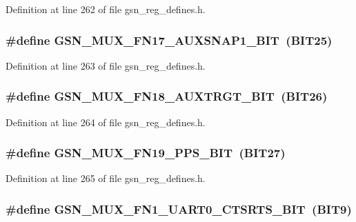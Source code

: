 Definition at line 262 of file gsn\_\-reg\_\-defines.h.

\hypertarget{a00546_af6cd23b5728c77f1cdf2127bc5075e1d}{
\subsubsection[{GSN\_\-MUX\_\-FN17\_\-AUXSNAP1\_\-BIT}]{\setlength{\rightskip}{0pt plus 5cm}\#define GSN\_\-MUX\_\-FN17\_\-AUXSNAP1\_\-BIT~(BIT25)}}
\label{a00546_af6cd23b5728c77f1cdf2127bc5075e1d}


Definition at line 263 of file gsn\_\-reg\_\-defines.h.

\hypertarget{a00546_ab9ab01862c25de4775d41150ca7ac187}{
\subsubsection[{GSN\_\-MUX\_\-FN18\_\-AUXTRGT\_\-BIT}]{\setlength{\rightskip}{0pt plus 5cm}\#define GSN\_\-MUX\_\-FN18\_\-AUXTRGT\_\-BIT~(BIT26)}}
\label{a00546_ab9ab01862c25de4775d41150ca7ac187}


Definition at line 264 of file gsn\_\-reg\_\-defines.h.

\hypertarget{a00546_a34e272cdfe3fdf3d66d84e62a5d82b6c}{
\subsubsection[{GSN\_\-MUX\_\-FN19\_\-PPS\_\-BIT}]{\setlength{\rightskip}{0pt plus 5cm}\#define GSN\_\-MUX\_\-FN19\_\-PPS\_\-BIT~(BIT27)}}
\label{a00546_a34e272cdfe3fdf3d66d84e62a5d82b6c}


Definition at line 265 of file gsn\_\-reg\_\-defines.h.

\hypertarget{a00546_a53aebca4d854c2382b9963eb743122ae}{
\subsubsection[{GSN\_\-MUX\_\-FN1\_\-UART0\_\-CTSRTS\_\-BIT}]{\setlength{\rightskip}{0pt plus 5cm}\#define GSN\_\-MUX\_\-FN1\_\-UART0\_\-CTSRTS\_\-BIT~(BIT9)}}
\label{a00546_a53aebca4d854c2382b9963eb743122ae}


